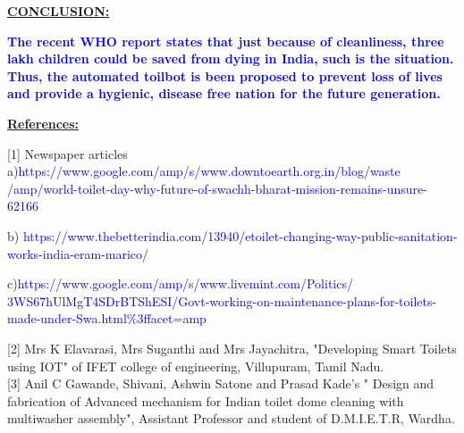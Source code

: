 \documentclass{beamer}
\begin{document}
\begin{frame}{\underline{\textbf{CONCLUSION:}}}


\textbf{\textcolor{blue}{The recent WHO report states that just because of cleanliness, three lakh children could be saved from dying in India, such is the situation. Thus, the automated toilbot is been proposed to prevent loss of lives and provide a hygienic, disease free nation for the future generation.
}}
\end{frame}











\begin{frame}{\underline{\textbf{References:}}}

[1] Newspaper articles\\a)\textcolor{blue}{https://www.google.com/amp/s/www.downtoearth.org.in/blog/waste\\/amp/world-toilet-day-why-future-of-swachh-bharat-mission-remains-unsure-62166\\}

b) \textcolor{blue}{https://www.thebetterindia.com/13940/etoilet-changing-way-public-sanitation-works-india-eram-marico/\\}

c)\textcolor{blue}{https://www.google.com/amp/s/www.livemint.com/Politics/\\3WS67hUlMgT4SDrBTShESI/Govt-working-on-maintenance-plans-for-toilets-made-under-Swa.html\%3ffacet=amp\\}

[2] Mrs K Elavarasi, Mrs Suganthi and Mrs Jayachitra, "Developing Smart Toilets using IOT" of IFET college of engineering, Villupuram, Tamil Nadu.\\

[3] Anil C Gawande, Shivani, Ashwin Satone and Prasad Kade's " Design and fabrication of Advanced mechanism for Indian toilet dome cleaning with multiwasher assembly", Assistant  Professor and student of D.M.I.E.T.R, Wardha.\\




\end{frame}
\end{document}
